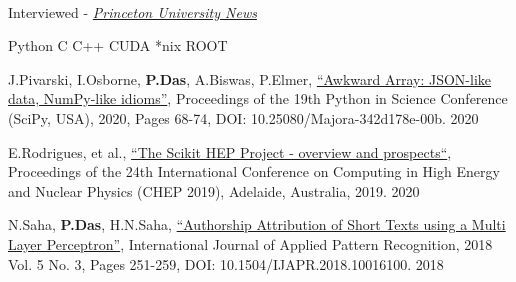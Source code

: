 \documentclass[10pt, letterpaper]{fulldeps}
\begin{document}
\vspace{-10pt}

%
%
\vspace{-5pt}
\\
\vspace{-15pt}
\begin{tightitemize}
\item Interviewed - \textit{\href{https://www.princeton.edu/news/2019/08/19/princeton-leads-efforts-develop-national-data-training-framework-high-energy}{Princeton University News}}
\end{tightitemize}
\vspace{-5pt}

%
%
\vspace{-3pt}
\textbullet{}Python \textbullet{}C \textbullet{}C++ \textbullet{}CUDA \textbullet{}*nix \textbullet{}ROOT
\vspace{-4pt}

%
%
\small{\begin{tightitemize}
    \item J.Pivarski, I.Osborne, {\textbf{P.Das}}, A.Biswas, P.Elmer, {\href{http://conference.scipy.org/proceedings/scipy2020/jim_pivarski.html}{``Awkward Array: JSON-like data, NumPy-like idioms''}}, Proceedings of the 19th Python in Science Conference (SciPy, USA), 2020, Pages 68-74, DOI: 10.25080/Majora-342d178e-00b. \hfill{2020}
    \item E.Rodrigues, et al., {\href{https://arxiv.org/abs/2007.03577}{``The Scikit HEP Project - overview and prospects``}}, Proceedings of the 24th International Conference on Computing in High Energy and Nuclear Physics (CHEP 2019), Adelaide, Australia, 2019. \hfill{2020}
    \item N.Saha, {\textbf{P.Das}}, H.N.Saha, {\href{https://www.inderscienceonline.com/doi/abs/10.1504/IJAPR.2018.094819}{``Authorship Attribution of Short Texts using a Multi Layer Perceptron''}}, International Journal of Applied Pattern Recognition, 2018 Vol. 5 No. 3, Pages 251-259, DOI: 10.1504/IJAPR.2018.10016100. \hfill{2018}
\end{tightitemize}}
\end{document}

